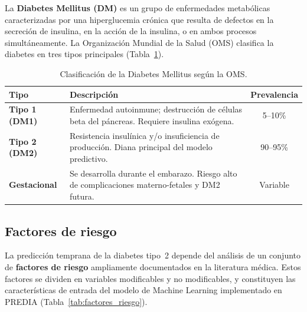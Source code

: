 \documentclass[12pt, letterpaper, twoside]{report}
\newcommand{\thead}[1]{\textbf{\sffamily #1}}
\newcommand{\trow}{}
\begin{document}
La \textbf{Diabetes Mellitus (DM)} es un grupo de enfermedades metabólicas caracterizadas por una hiperglucemia crónica que resulta de defectos en la secreción de insulina, en la acción de la insulina, o en ambos procesos simultáneamente. La Organización Mundial de la Salud (OMS) clasifica la diabetes en tres tipos principales (Tabla~\ref{tab:clasificacion_dm}).

\begin{table}[H]
  \centering
  \caption{Clasificación de la Diabetes Mellitus según la OMS.}
  \label{tab:clasificacion_dm}
  \begin{tabularx}{\linewidth}{>{\bfseries\sffamily}l X c}
    \toprule
    \thead{Tipo} & \thead{Descripción} & \thead{Prevalencia} \\
    \midrule
    \trow Tipo 1 (DM1) & Enfermedad autoinmune; destrucción de células beta del páncreas. Requiere insulina exógena. & 5--10\% \\
    Tipo 2 (DM2) & Resistencia insulínica y/o insuficiencia de producción. Diana principal del modelo predictivo. & 90--95\% \\
    \trow Gestacional & Se desarrolla durante el embarazo. Riesgo alto de complicaciones materno-fetales y DM2 futura. & Variable \\
    \bottomrule
  \end{tabularx}
\end{table}

\subsection{Factores de riesgo}

La predicción temprana de la diabetes tipo~2 depende del análisis de un conjunto de \textbf{factores de riesgo} ampliamente documentados en la literatura médica. Estos factores se dividen en variables modificables y no modificables, y constituyen las características de entrada del modelo de Machine Learning implementado en PREDIA (Tabla~\ref{tab:factores_riesgo}).
\end{document}
